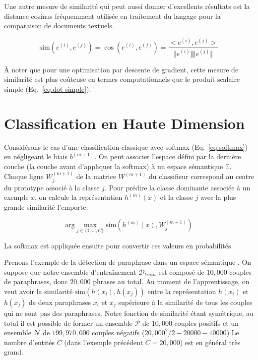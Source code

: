 Une autre mesure de similarité qui peut aussi donner d'excellents résultats est la
distance cosinus fréquemment utilisée en traitement du langage pour la
comparaison de documents textuels.  

\begin{equation}
\textrm{sim}(e^{(i)}, e^{(j)})=\cos (e^{(i)}, e^{(j)}) = \dfrac{ <e^{(i)}, e^{(j)}> }{\Vert e^{(i)}\Vert \Vert e^{(j)}\Vert}
\end{equation}

À noter que pour une optimisation par descente de gradient, cette mesure de
similarité est plus coûteuse en termes computationnels que le produit scalaire
simple (Eq.~\ref{eq:dot-simple}).

\section{Classification en Haute Dimension}
\label{sec:chd}

Considérons le cas d'une classification classique avec softmax
(Eq.~\ref{eq:softmax}) en négligeant le biais $b^{(m+1)}$. On peut associer
l'espace défini par la dernière couche (la couche avant d'appliquer la softmax)
à un espace sémantique $\mathbb{E}$.  Chaque ligne $W^{(m+1)}_{j.}$ de la
matrice $W^{(m+1)}$ du classifieur correspond au centre du prototype associé à
la classe $j$. Pour prédire la classe dominante associée à un exemple $x$, on
calcule la représentation $h^{(m)}(x)$ et la classe $j$ avec la plus grande
similarité l'emporte:

\begin{equation}
\textrm{arg}\max_{j\in\lbrace 1,\dots ,C\rbrace} \textrm{sim}(h^{(m)}(x), W^{(m+1)}_{j.})
\end{equation}

La softmax est appliquée ensuite pour convertir ces valeurs en probabilités.

Prenons l'exemple de la détection de paraphrase dans un espace sémantique
\citep{msr-paraphrase}. On suppose que notre ensemble d'entraînement
$\mathcal{D}_{train}$ est composé de $10,000$ couples de paraphrases, donc
$20,000$ phrases au total. Au moment de l'apprentissage, on veut avoir la similarité
$\textrm{sim}(h(x_i),h(x_j))$ entre la représentation $h(x_i)$ et $h(x_j)$ de
deux paraphrases $x_i$ et $x_j$ supérieure à la similarité de tous les couples
qui ne sont pas des paraphrases. Notre fonction de similarité étant symétrique,
au total il est possible de former un ensemble $\mathcal{P}$ de $10,000$
couples positifs et un ensemble $\mathcal{N}$ de $199,970,000$ couples négatifs
($20,000^2/2 - 20000 - 10000$) Le nombre d'entités $C$ (dans l'exemple
précédent $C=20,000$) est en général très grand.

